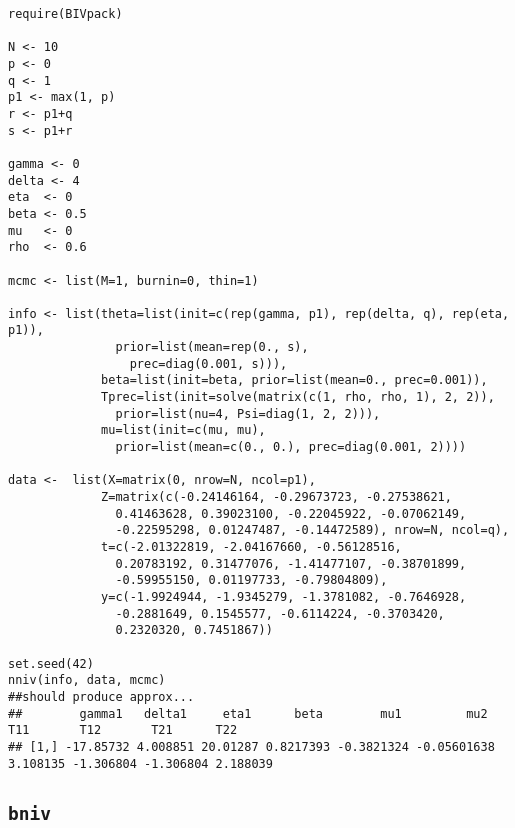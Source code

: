 \documentclass[12pt,oneside]{article}
\begin{document}
\begin{verbatim}
require(BIVpack)

N <- 10
p <- 0
q <- 1
p1 <- max(1, p)
r <- p1+q
s <- p1+r

gamma <- 0
delta <- 4 
eta  <- 0
beta <- 0.5
mu   <- 0
rho  <- 0.6

mcmc <- list(M=1, burnin=0, thin=1)

info <- list(theta=list(init=c(rep(gamma, p1), rep(delta, q), rep(eta, p1)),
               prior=list(mean=rep(0., s),
                 prec=diag(0.001, s))),
             beta=list(init=beta, prior=list(mean=0., prec=0.001)),
             Tprec=list(init=solve(matrix(c(1, rho, rho, 1), 2, 2)),
               prior=list(nu=4, Psi=diag(1, 2, 2))),
             mu=list(init=c(mu, mu),
               prior=list(mean=c(0., 0.), prec=diag(0.001, 2))))

data <-  list(X=matrix(0, nrow=N, ncol=p1),
             Z=matrix(c(-0.24146164, -0.29673723, -0.27538621,
               0.41463628, 0.39023100, -0.22045922, -0.07062149,
               -0.22595298, 0.01247487, -0.14472589), nrow=N, ncol=q),
             t=c(-2.01322819, -2.04167660, -0.56128516,
               0.20783192, 0.31477076, -1.41477107, -0.38701899,
               -0.59955150, 0.01197733, -0.79804809),
             y=c(-1.9924944, -1.9345279, -1.3781082, -0.7646928,
               -0.2881649, 0.1545577, -0.6114224, -0.3703420,
               0.2320320, 0.7451867))

set.seed(42)
nniv(info, data, mcmc)
##should produce approx...
##        gamma1   delta1     eta1      beta        mu1         mu2      T11       T12       T21      T22
## [1,] -17.85732 4.008851 20.01287 0.8217393 -0.3821324 -0.05601638 3.108135 -1.306804 -1.306804 2.188039
\end{verbatim}

\subsection{\texttt{bniv}}
\end{document}
